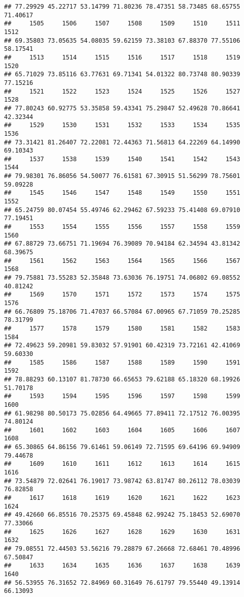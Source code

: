 \documentclass[
]{article}
\begin{document}
\begin{verbatim}
## 77.29929 45.22717 53.14799 71.80236 78.47351 58.73485 68.65755 71.40617 
##     1505     1506     1507     1508     1509     1510     1511     1512 
## 69.35803 73.05635 54.08035 59.62159 73.38103 67.88370 77.55106 58.17541 
##     1513     1514     1515     1516     1517     1518     1519     1520 
## 65.71029 73.85116 63.77631 69.71341 54.01322 80.73748 80.90339 77.15216 
##     1521     1522     1523     1524     1525     1526     1527     1528 
## 77.80243 60.92775 53.35858 59.43341 75.29847 52.49628 70.86641 42.32344 
##     1529     1530     1531     1532     1533     1534     1535     1536 
## 73.31421 81.26407 72.22081 72.44363 71.56813 64.22269 64.14990 69.10343 
##     1537     1538     1539     1540     1541     1542     1543     1544 
## 79.98301 76.86056 54.50077 76.61581 67.30915 51.56299 78.75601 59.09228 
##     1545     1546     1547     1548     1549     1550     1551     1552 
## 65.24759 80.07454 55.49746 62.29462 67.59233 75.41408 69.07910 77.19451 
##     1553     1554     1555     1556     1557     1558     1559     1560 
## 67.88729 73.66751 71.19694 76.39089 70.94184 62.34594 43.81342 68.39675 
##     1561     1562     1563     1564     1565     1566     1567     1568 
## 79.75881 73.55283 52.35848 73.63036 76.19751 74.06802 69.08552 40.81242 
##     1569     1570     1571     1572     1573     1574     1575     1576 
## 66.76809 75.18706 71.47037 66.57084 67.00965 67.71059 70.25285 78.31799 
##     1577     1578     1579     1580     1581     1582     1583     1584 
## 72.49623 59.20981 59.83032 57.91901 60.42319 73.72161 42.41069 59.60330 
##     1585     1586     1587     1588     1589     1590     1591     1592 
## 78.88293 60.13107 81.78730 66.65653 79.62188 65.18320 68.19926 51.70178 
##     1593     1594     1595     1596     1597     1598     1599     1600 
## 61.98298 80.50173 75.02856 64.49665 77.89411 72.17512 76.00395 74.80124 
##     1601     1602     1603     1604     1605     1606     1607     1608 
## 65.30865 64.86156 79.61461 59.06149 72.71595 69.64196 69.94909 79.44678 
##     1609     1610     1611     1612     1613     1614     1615     1616 
## 73.54879 72.02641 76.19017 73.98742 63.81747 80.26112 78.03039 76.82858 
##     1617     1618     1619     1620     1621     1622     1623     1624 
## 49.42660 66.85516 70.25375 69.45848 62.99242 75.18453 52.69070 77.33066 
##     1625     1626     1627     1628     1629     1630     1631     1632 
## 79.08551 72.44503 53.56216 79.28879 67.26668 72.68461 70.48996 67.50847 
##     1633     1634     1635     1636     1637     1638     1639     1640 
## 56.53955 76.31652 72.84969 60.31649 76.61797 79.55440 49.13914 66.13093 

\end{verbatim}
\end{document}
